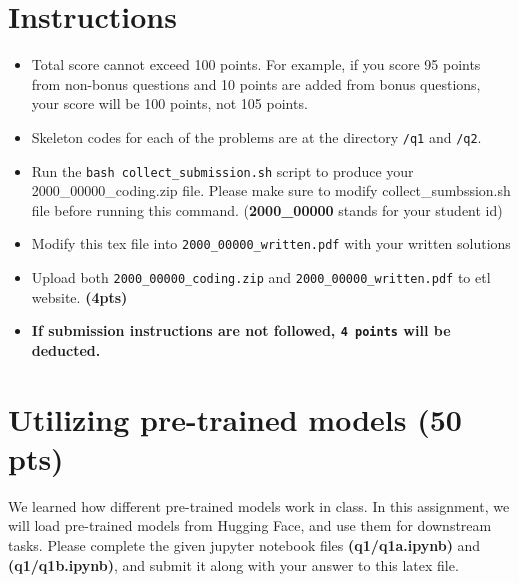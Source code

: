 \documentclass{assignment format}
\begin{document}
\begin{center}

\end{center}

\section{Instructions}
\begin{itemize}
\item Total score cannot exceed 100 points. For example, if you score 95 points from non-bonus questions and 10 points are added from bonus questions, your score will be 100 points, not 105 points.
\item Skeleton codes for each of the problems are at the directory \texttt{/q1} and \texttt{/q2}.  
\item Run the \texttt{bash collect\_submission.sh} script to produce your 2000\_00000\_coding.zip file. Please make sure to modify collect\_sumbssion.sh file before running this command. (\textbf{2000\_00000} stands for your student id)
\item Modify this tex file into \texttt{2000\_00000\_written.pdf} with your written solutions
\item Upload both \texttt{2000\_00000\_coding.zip} and \texttt{2000\_00000\_written.pdf} to etl website. \textbf{(4pts)}
\item \textbf{If submission instructions are not followed, \texttt{4 points} will be deducted.}
\end{itemize}


\section{Utilizing pre-trained models (50 pts)}
We learned how different pre-trained models work in class. In this assignment, we will load pre-trained models from Hugging Face, and use them for downstream tasks. Please complete the given jupyter notebook files \textbf{(q1/q1a.ipynb)} and \textbf{(q1/q1b.ipynb)}, and submit it along with your answer to this latex file.
\end{document}
